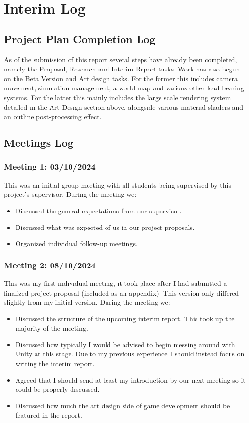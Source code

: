 \documentclass{report}
\begin{document}
\chapter{Interim Log}

\section{Project Plan Completion Log}

As of the submission of this report several steps have already been completed, namely the Proposal, Research and Interim Report tasks. Work has also begun on the Beta Version and Art design tasks. For the former this includes camera movement, simulation management, a world map and various other load bearing systems. For the latter this mainly includes the large scale rendering system detailed in the Art Design section above, alongside various material shaders and an outline post-processing effect.

\section{Meetings Log}

\subsection{Meeting 1: 03/10/2024}

This was an initial group meeting with all students being supervised by this project's supervisor. During the meeting we:
\begin{itemize}
  \item Discussed the general expectations from our supervisor. 
  \item Discussed what was expected of us in our project proposals. 
  \item Organized individual follow-up meetings. 
\end{itemize}

\subsection{Meeting 2: 08/10/2024}

This was my first individual meeting, it took place after I had submitted a finalized project proposal (included as an appendix). This version only differed slightly from my initial version. During the meeting we:
\begin{itemize}
  \item Discussed the structure of the upcoming interim report. This took up the majority of the meeting.
  \item Discussed how typically I would be advised to begin messing around with Unity at this stage. Due to my previous experience I should instead focus on writing the interim report. 
  \item Agreed that I should send at least my introduction by our next meeting so it could be properly discussed.
  \item Discussed how much the art design side of game development should be featured in the report.
\end{itemize}
\end{document}

